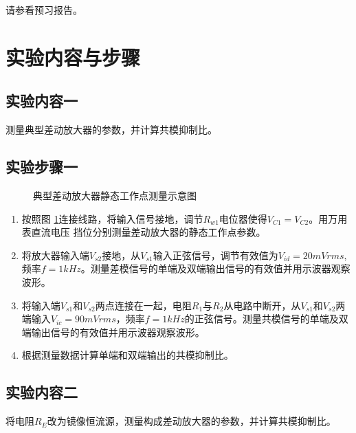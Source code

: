 \documentclass[a4paper,11pt,UTF8]{ctexart}
\begin{document}
请参看预习报告。

\section{实验内容与步骤}
\subsection{实验内容一}
  测量典型差动放大器的参数，并计算共模抑制比。
\subsection{实验步骤一}
\begin{figure}[htbp]
  \centering
  \caption{典型差动放大器静态工作点测量示意图}
  \label{fig:nStatic}
  \end{figure}
\begin{enumerate}
  \item 按照图 \ref{fig:nStatic}连接线路，将输入信号接地，调节$R_{w1}$电位器使得$V_{C1}=V_{C2}$。用万用表直流电压
  挡位分别测量差动放大器的静态工作点参数。
  \item 将放大器输入端$V_{s2}$接地，从$V_{s1}$输入正弦信号，调节有效值为$V_{id}=20mVrms$,频率$f=1kHz$。测量差模信号的单端及双端输出信号的有效值并用示波器观察波形。
  \item 将输入端$V_{s1}$和$V_{s2}$两点连接在一起，电阻$R_1$与$R_2$从电路中断开，从$V_{s1}$和$V_{s2}$两端输入$V_{ic}=90mVrms$，频率$f=1kHz$的正弦信号。测量共模信号的单端及双端输出信号的有效值并用示波器观察波形。
  \item 根据测量数据计算单端和双端输出的共模抑制比。
\end{enumerate}
\subsection{实验内容二}
  将电阻$R_E$改为镜像恒流源，测量构成差动放大器的参数，并计算共模抑制比。
\end{document}
